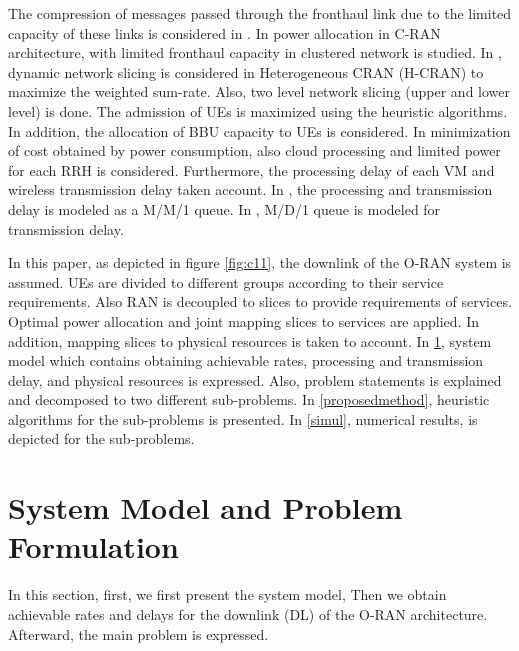 \documentclass[conference]{IEEEtran}
\begin{document}
The compression of messages passed through the fronthaul link due to the limited capacity of these links is considered in \cite{simeone2016cloud,1111}. 
In \cite{motalleb2017optimal} power allocation in C-RAN architecture, with limited fronthaul capacity in clustered network is studied.
In \cite{lee2018dynamic}, dynamic network slicing is considered in Heterogeneous CRAN (H-CRAN) to maximize the weighted sum-rate. Also, two level network slicing (upper and lower level) is done. The admission of UEs is maximized using the heuristic algorithms. In addition, the allocation of BBU capacity to UEs is considered.\newline
In \cite{frdl,luong2018novel,luong2018novel1,guo2016exploiting} minimization of cost obtained by power consumption, also cloud processing and limited power for each RRH is considered. Furthermore, the processing delay of each VM and wireless transmission delay taken account. In \cite{frdl}, the processing and transmission delay is modeled as 
a M/M/1 queue. In \cite{guo2016exploiting}, M/D/1 queue is modeled for transmission delay.

In this paper, as  depicted in figure \ref{fig:c11}, the downlink of the O-RAN system is assumed. UEs are divided to different groups according to 
their service requirements. Also RAN is decoupled to slices to provide requirements of services. Optimal power allocation and joint mapping slices to services are applied. In addition, mapping slices to physical resources is taken to account.\newline
In \ref{systemmodel}, system model which contains obtaining achievable rates, processing and transmission delay, and physical resources is expressed. Also, problem statements is explained and decomposed to two
different sub-problems. 
In \ref{proposedmethod}, heuristic algorithms for the sub-problems is presented. In \ref{simul}, numerical results, is depicted for the sub-problems.

\section{System Model and Problem Formulation}\label{systemmodel}
In this section, first, we first present the system model, Then we obtain achievable rates and delays for the downlink (DL) of the O-RAN architecture.
Afterward, the main problem is expressed.
\end{document}
